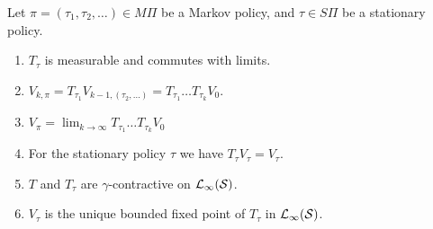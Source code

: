 \begin{prop}
  Let $\pi = (\tau_1, \tau_2, \dots) \in M\Pi$ be a Markov policy,
  and $\tau \in S\Pi$ be a stationary policy.
  \begin{enumerate}
    \item $T_\tau$ is measurable and commutes with limits.
    \item $V_{k, \pi} = T_{\tau_1} V_{k-1, (\tau_2, \dots)}
      = T_{\tau_1} \dots T_{\tau_k} V_0$.
    \item $V_\pi = \lim_{k \to \infty} T_{\tau_1} \dots T_{\tau_k} V_0$
    \item For the stationary policy $\tau$ we have $T_\tau V_\tau = V_\tau$.
    \item $T$ and $T_\tau$ are $\gamma$-contractive
      on $\mathcal{L}_\infty(\mathcal{S})$.
    \item $V_\tau$ is the unique bounded fixed point of $T_\tau$
      in $\mathcal{L}_\infty(\mathcal{S})$.
  \end{enumerate} 
  \label{prop:propTpiV}
\end{prop}
